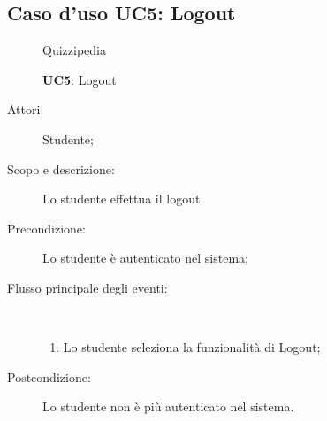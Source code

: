 \subsection{Caso d'uso UC5: Logout}
	\begin{figure}[H]
		\centering
		\begin{resizedtikzpicture}{\textwidth}
		\begin{umlsystem}[x=0, fill=lightgray!20]{Quizzipedia}
		\end{umlsystem}
		\end{resizedtikzpicture}
		\caption{\textbf{UC5}: Logout}
		\label{UC5}
	\end{figure}
\begin{description}
\item[Attori:] Studente;
\item[Scopo e descrizione:] Lo studente effettua il logout
      \item[Precondizione:] Lo studente è autenticato nel sistema;

        \item[Flusso principale degli eventi:] \ 
 \begin{enumerate}
          \item Lo studente seleziona la funzionalità di Logout;

      \end{enumerate}
    \item[Postcondizione:] Lo studente non è più autenticato nel sistema.
  \end{description}
\hypertarget{UC6}{}
